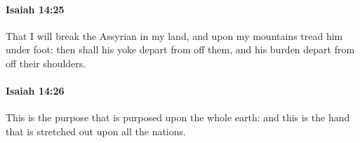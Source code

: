 		\paragraph{Isaiah 14:25} %
			\label{ISAIAH-14-25}

			That I will break the Assyrian in my land, and upon my mountains tread him under foot: then shall his yoke depart from off them, and his burden depart from off their shoulders.


		\paragraph{Isaiah 14:26} %
			\label{ISAIAH-14-26}

			This is the purpose that is purposed upon the whole earth: and this is the hand that is stretched out upon all the nations.


